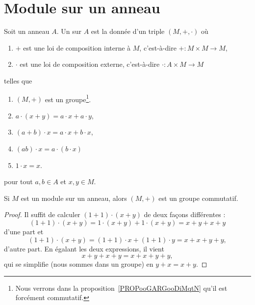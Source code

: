 
\section{Module sur un anneau}

\begin{definition}       \label{DEFooHXITooBFvzrR}
    Soit un anneau \( A\). Un  sur \( A\) est la donnée d'un triple \( (M,+,\cdot)\) où
    \begin{enumerate}
        \item
            \( +\) est une loi de composition interne à \( M\), c'est-à-dire \( +\colon M\times M\to M\),
        \item
            \( \cdot\) est une loi de composition externe, c'est-à-dire \( \cdot\colon A\times M\to M\)
    \end{enumerate}
    telles que
    \begin{enumerate}
        \item
            \( (M,+)\) est un groupe\footnote{Nous verrons dans la proposition~\ref{PROPooGARGooDiMqtN} qu'il est forcément commutatif.}.
        \item
            \( a\cdot(x+y)=a\cdot x+a\cdot y\),
        \item
            \( (a+b)\cdot x=a\cdot x+b\cdot x\),
        \item
            \( (ab)\cdot x=a\cdot(b\cdot x)\)
        \item
            \( 1\cdot x=x\).
    \end{enumerate}
    pour tout \( a,b\in A\) et \( x,y\in M\).
\end{definition}

\begin{proposition}\label{PROPooGARGooDiMqtN}
    Si \( M\) est un module sur un anneau, alors \( (M,+)\) est un groupe commutatif.
\end{proposition}

\begin{proof}
    Il suffit de calculer \( (1+1)\cdot (x+y)\) de deux façons différentes :
    \begin{equation}
        (1+1)\cdot (x+y)=1\cdot (x+y)+1\cdot (x+y)=x+y+x+y
    \end{equation}
    d'une part et
    \begin{equation}
        (1+1)\cdot (x+y)=(1+1)\cdot x+(1+1)\cdot y=x+x+y+y,
    \end{equation}
    d'autre part. En égalant les deux expressions, il vient
    \begin{equation}
        x+y+x+y=x+x+y+y,
    \end{equation}
    qui se simplifie (nous sommes dans un groupe) en \( y+x=x+y\).
\end{proof}

